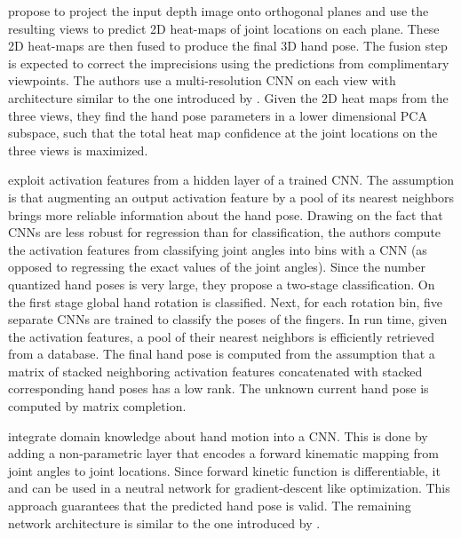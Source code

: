 \hspace{-0.4em}
\textbf{\cite{ge2016robust}} 
propose to project the input depth image onto orthogonal planes and use the resulting views to predict 2D heat-maps of joint locations on each plane. These 2D heat-maps are then fused to produce the final 3D hand pose. The fusion step is expected to correct the imprecisions using the predictions from complimentary viewpoints. The authors use a multi-resolution CNN on each view with architecture similar to the one introduced by \cite{tompson2014real}. Given the 2D heat maps from the three views, they find the hand pose parameters in a lower dimensional PCA subspace, such that the total heat map confidence at the joint locations on the three views is maximized. 

\hspace{-0.4em}
\textbf{\cite{sinha2016deephand}} 
exploit activation features from a hidden layer of a trained CNN. The assumption is that augmenting an output activation feature by a pool of its nearest neighbors brings more reliable information about the hand pose. Drawing on the fact that CNNs are less robust for regression than for classification, the authors compute the activation features from classifying joint angles into bins with a CNN (as opposed to regressing the exact values of the joint angles). Since the number quantized hand poses is very large, they propose a  two-stage classification. On the first stage global hand rotation is classified. Next, for each rotation bin, five separate CNNs are trained to classify the poses of the fingers. In run time, given the activation features, a pool of their nearest neighbors is efficiently retrieved from a database. The final hand pose is computed from the assumption that a matrix of stacked neighboring activation features concatenated with stacked corresponding hand poses has a low rank. The unknown current hand pose is computed by matrix completion.

\hspace{-0.4em}
\textbf{\cite{zhou2016model}} 
integrate domain knowledge about hand motion into a CNN. This is done by adding a non-parametric layer that encodes a forward kinematic mapping from joint angles to joint locations. Since forward kinetic function is differentiable, it and can be used in a neutral network for gradient-descent like optimization. This approach guarantees that the predicted hand pose is valid. The remaining network architecture is similar to the one introduced by \cite{oberweger2015hands}.

